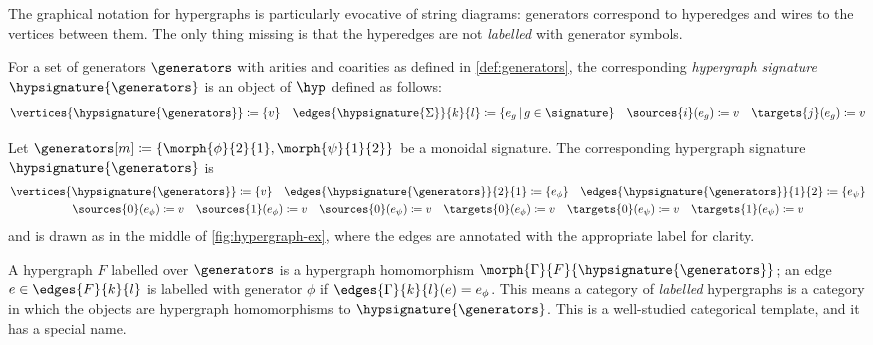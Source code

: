 The graphical notation for hypergraphs is particularly evocative of string
diagrams: generators
correspond to hyperedges and wires to the vertices between them.
The only thing missing is that the hyperedges are not \emph{labelled} with
generator symbols.

\begin{definition}
    For a set of generators \(\generators\) with arities and coarities as defined
    in \cref{def:generators}, the corresponding \emph{hypergraph signature}
    \(\hypsignature{\generators}\) is an object of \(\hyp\) defined as follows:
    \begin{gather*}
        \vertices{\hypsignature{\generators}}
        \coloneqq
        \{ v \}
        \quad
        \edges{\hypsignature{\Sigma}}{k}{l}
        \coloneqq
        \{ e_g \,|\, g \in \signature\}
        \quad
        \sources{i}(e_g) \coloneqq v
        \quad
        \targets{j}(e_g) \coloneqq v
    \end{gather*}
\end{definition}

\begin{example}\label{ex:labelled-hypergraph-signature}
    Let \(\generators[m] \coloneqq \{\morph{\phi}{2}{1}, \morph{\psi}{1}{2}\}\)
    be a monoidal signature.
    The corresponding hypergraph signature \(\hypsignature{\generators}\) is
    \begin{gather*}
        \vertices{\hypsignature{\generators}} \coloneqq \{v\}
        \quad
        \edges{\hypsignature{\generators}}{2}{1} \coloneqq \{e_\phi\}
        \quad
        \edges{\hypsignature{\generators}}{1}{2} \coloneqq \{e_\psi\}
        \\
        \sources{0}(e_\phi) \coloneqq v
        \quad
        \sources{1}(e_\phi) \coloneqq v
        \quad
        \sources{0}(e_\psi) \coloneqq v
        \quad
        \targets{0}(e_\phi) \coloneqq v
        \quad
        \targets{0}(e_\psi) \coloneqq v
        \quad
        \targets{1}(e_\psi) \coloneqq v
    \end{gather*}
    and is drawn as in the middle of \cref{fig:hypergraph-ex}, where the edges
    are annotated with the appropriate label for clarity.
\end{example}

A hypergraph \(F\) labelled over \(\generators\) is a hypergraph homomorphism
\(\morph{\Gamma}{F}{\hypsignature{\generators}}\);
an edge \(e \in \edges{F}{k}{l}\) is labelled with generator
\(\phi\) if \(\edges{\Gamma}{k}{l}(e) = e_\phi\).
This means a category of \emph{labelled} hypergraphs is a category in which the
objects are hypergraph homomorphisms to \(\hypsignature{\generators}\).
This is a well-studied categorical template, and it has a special name.

